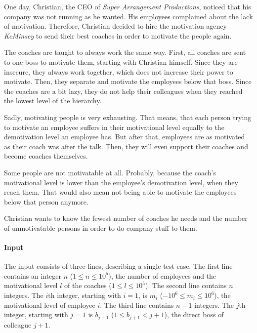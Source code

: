 



\makeheader

One day, Christian, the CEO of \textit{Super Arrangement Productions}, noticed that his company
was not running as he wanted. His employees complained about the lack of motivation.
Therefore, Christian decided to hire the motivation agency \textit{KcMinsey} to send their best
coaches in order to motivate the people again.

The coaches are taught to always work the same way. First, all coaches are sent to one boss to
motivate them, starting with Christian himself. Since they are insecure, they always work together,
which does not increase their power to motivate.
Then, they separate and motivate the employees below that boss. Since the coaches are a bit lazy,
they do not help their colleagues when they reached the lowest level of the hierarchy.

Sadly, motivating people is very exhausting. That means, that each person trying to motivate
an employee suffers in their motivational level equally to the demotivation level an employee
has. But after that, employees are as motivated as their coach was after the talk. Then,
they will even support their coaches and become coaches themselves.

Some people are not motivatable at all. Probably, because the coach's motivational level is lower
than the employee's demotivation level, when they reach them. 
That would also mean not being able to motivate the employees below that person anymore.

Christian wants to know the fewest number of coaches he needs and the number
of unmotivatable persons in order to do company stuff to them.

\paragraph*{Input}

The input consists of three lines, describing a single test case.
The first line contains an integer $n$ ($1 \leq n \leq 10^5$), the number of employees and the motivational level $l$ of the coaches ($1 \leq l \leq 10^5$).
The second line contains $n$ integers. The $i$th integer, starting with $i = 1$, is $m_i$ ($-10^6 \leq m_i \leq 10^6$), the motivational level of employee $i$.
The third line contains $n - 1$ integers. The $j$th integer, starting with $j = 1$ is $b_{j+1}$ ($1 \leq b_{j+1} < j + 1$), the direct boss of colleague $j + 1$.

